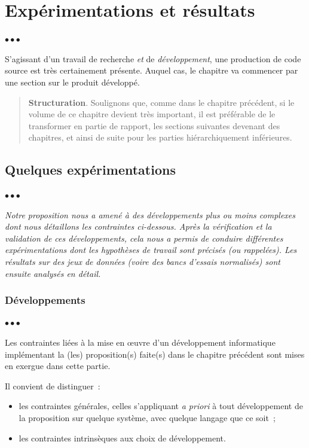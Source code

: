\documentclass[11pt, french, screen, research-development]{report-rd-info}
\newenvironment{structuration}{\begin{quote}\textbf{Structuration}. }{\end{quote}}
\newenvironment{explanation}
{\color{blue}
 \begin{list}{}{\hspace{0.2\textwidth}\color{blue}}\item $\bullet\bullet\bullet$
}
{\end{list}}
\begin{document}

\chapter{Expérimentations et résultats}
\label{chap:Experimentations}

\begin{explanation}
   S'agissant d'un travail de recherche \emph{et} de \emph{développement}, une production de code source est très certainement présente.
   Auquel cas, le chapitre va commencer par une section sur le produit développé.

   \begin{structuration}
      Soulignons que, comme dans le chapitre précédent, si le volume de ce chapitre devient très important, il est préférable de le transformer en partie de rapport, les sections suivantes devenant des chapitres, et ainsi de suite pour les parties hiérarchiquement inférieures.
   \end{structuration}
\end{explanation}

\section{Quelques expérimentations}

\begin{explanation}
   \emph{Notre proposition nous a amené à des développements plus ou moins complexes dont nous détaillons les contraintes ci-dessous.
   Après la vérification et la validation de ces développements, cela nous a permis de conduire différentes expérimentations dont les hypothèses de travail sont précisés (ou rappelées).
   Les résultats sur des jeux de données (voire des bancs d'essais normalisés) sont ensuite analysés en détail.}
\end{explanation}

\subsection{Développements}

\begin{explanation}
   Les contraintes liées à la mise en \oe uvre d'un développement informatique implémentant la (les) proposition(s) faite(s) dans le chapitre précédent sont mises en exergue dans cette partie.

   Il convient de distinguer~:
   \begin{itemize}
      \item les contraintes générales, celles s'appliquant \emph{a priori} à tout développement de la proposition sur quelque système, avec quelque langage que ce soit~;
      \item les contraintes intrinsèques aux choix de développement.
   \end{itemize}
\end{explanation}
\end{document}
